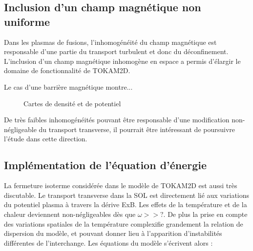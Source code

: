 \begin{refsection}
	\subsection{Inclusion d'un champ magnétique non uniforme}
	Dans les plasmas de fusions, l'inhomogénéité du champ magnétique est
	responsable d'une partie du transport turbulent et donc du déconfinement.
	L'inclusion d'un champ magnétique inhomogène en espace a permis d'élargir le domaine de fonctionnalité de TOKAM2D. 
	
	Le cas d'une barrière magnétique montre...
	\begin{figure}
    \centering
    \caption{Cartes de densité  et de potentiel
    }
    \label{2-CartesMagBarrier}
\end{figure}

	
	De très faibles inhomogénéités pouvant être responsable d'une modification non-négligeable du transport transverse, il pourrait 
	être intéressant de poursuivre l'étude dans cette direction.
	
	\subsection{Implémentation de l'équation d'énergie}
	La fermeture isoterme considérée dans le modèle de TOKAM2D est aussi très
	discutable. Le transport transverse dans la SOL est directement lié aux
	variations du potentiel plasma à travers la dérive ExB.  Les effets de la température et de la chaleur deviennent
	non-négligeables dès que $\omega>>\text{?}$. De plus la prise en compte des
	variations spatiales de la température complexifie grandement la relation de
	dispersion du modèle, et pouvant donner lieu à l'apparition d'instabilités différentes de l'interchange.
	Les équations du modèle s'écrivent alors :
	

\end{refsection}
